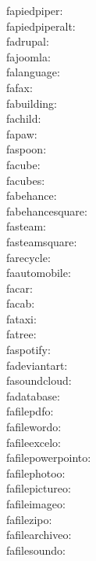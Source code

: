 fapiedpiper: {\FA \fapiedpiper} \\
fapiedpiperalt: {\FA \fapiedpiperalt} \\
fadrupal: {\FA \fadrupal} \\
fajoomla: {\FA \fajoomla} \\
falanguage: {\FA \falanguage} \\
fafax: {\FA \fafax} \\
fabuilding: {\FA \fabuilding} \\
fachild: {\FA \fachild} \\
fapaw: {\FA \fapaw} \\
faspoon: {\FA \faspoon} \\
facube: {\FA \facube} \\
facubes: {\FA \facubes} \\
fabehance: {\FA \fabehance} \\
fabehancesquare: {\FA \fabehancesquare} \\
fasteam: {\FA \fasteam} \\
fasteamsquare: {\FA \fasteamsquare} \\
farecycle: {\FA \farecycle} \\
faautomobile: {\FA \faautomobile} \\
facar: {\FA \facar} \\
facab: {\FA \facab} \\
fataxi: {\FA \fataxi} \\
fatree: {\FA \fatree} \\
faspotify: {\FA \faspotify} \\
fadeviantart: {\FA \fadeviantart} \\
fasoundcloud: {\FA \fasoundcloud} \\
fadatabase: {\FA \fadatabase} \\
fafilepdfo: {\FA \fafilepdfo} \\
fafilewordo: {\FA \fafilewordo} \\
fafileexcelo: {\FA \fafileexcelo} \\
fafilepowerpointo: {\FA \fafilepowerpointo} \\
fafilephotoo: {\FA \fafilephotoo} \\
fafilepictureo: {\FA \fafilepictureo} \\
fafileimageo: {\FA \fafileimageo} \\
fafilezipo: {\FA \fafilezipo} \\
fafilearchiveo: {\FA \fafilearchiveo} \\
fafilesoundo: {\FA \fafilesoundo} \\
